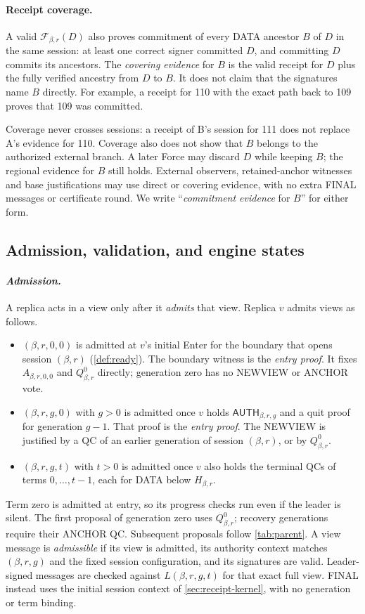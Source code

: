 \documentclass[11pt,a4paper]{article}
\newcommand{\FC}{\mathcal F}
\newcommand{\tagg}[1]{\ensuremath{\mathsf{#1}}}
\newcommand{\defterm}[1]{\textcolor{rrBlue}{\textit{#1}}}
\begin{document}
\paragraph{Receipt coverage.}
\label{sec:coverage}
A valid $\FC_{\beta,r}(D)$ also proves commitment of every DATA ancestor
$B$ of $D$ in the same session: at least one correct signer committed
$D$, and committing $D$ commits its ancestors. The \defterm{covering
evidence} for $B$ is the valid receipt for $D$ plus the fully verified
ancestry from $D$ to $B$. It does not claim that the signatures name $B$
directly. For example, a receipt for 110 with the exact path back to 109
proves that 109 was committed.

Coverage never crosses sessions: a receipt of B's session for 111 does
not replace A's evidence for 110. Coverage also does not show that $B$
belongs to the authorized external branch. A later Force may discard $D$
while keeping $B$; the regional evidence for $B$ still holds. External
observers, retained-anchor witnesses and base justifications may use
direct or covering evidence, with no extra FINAL messages or certificate
round. We write ``\defterm{commitment evidence} for $B$'' for either form.

\subsection{Admission, validation, and engine states}
\label{sec:admission}
\paragraph{\defterm{Admission.}}
A replica acts in a view only after it \emph{admits} that view.
Replica $v$ admits views as follows.
\begin{itemize}
\item $(\beta,r,0,0)$ is admitted at $v$'s initial Enter for the boundary
that opens session $(\beta,r)$ (\cref{def:ready}). The boundary witness is
the \defterm{entry proof}. It fixes $A_{\beta,r,0,0}$ and
$Q^0_{\beta,r}$ directly; generation zero has no NEWVIEW or ANCHOR vote.
\item $(\beta,r,g,0)$ with $g>0$ is admitted once $v$ holds
$\tagg{AUTH}_{\beta,r,g}$ and a quit proof for generation $g-1$. That proof is
the \defterm{entry proof}. The NEWVIEW is justified by a QC of an earlier
generation of session $(\beta,r)$, or by $Q_{\beta,r}^0$.
\item $(\beta,r,g,t)$ with $t>0$ is admitted once $v$ also holds the
terminal QCs of terms $0,\ldots,t-1$, each for DATA below $H_{\beta,r}$.
\end{itemize}
Term zero is admitted at entry, so its progress checks run even if
the leader is silent. The first proposal of generation zero uses
$Q^0_{\beta,r}$; recovery generations require their ANCHOR QC.
Subsequent proposals follow \cref{tab:parent}. A view message is
\defterm{admissible} if its view is admitted, its authority context matches
$(\beta,r,g)$ and the fixed session configuration, and its signatures are
valid. Leader-signed messages are checked against $L(\beta,r,g,t)$ for
that exact full view.
FINAL instead uses the initial session context of \cref{sec:receipt-kernel},
with no generation or term binding.
\end{document}
